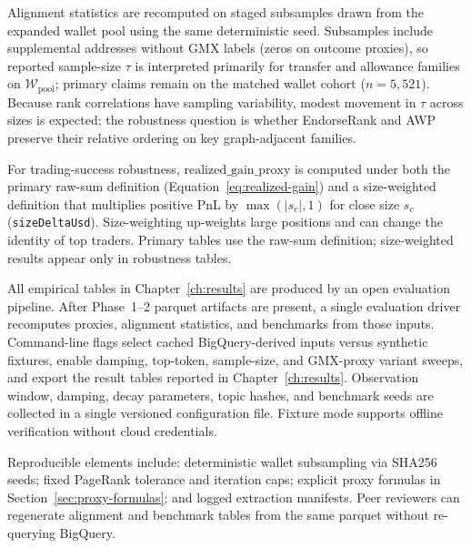 Alignment statistics are recomputed on staged subsamples drawn from the expanded wallet pool using the same deterministic seed. Subsamples include supplemental addresses without GMX labels (zeros on outcome proxies), so reported sample-size $\tau$ is interpreted primarily for transfer and allowance families on $\mathcal{W}_{\mathrm{pool}}$; primary claims remain on the matched wallet cohort ($n=5{,}521$). Because rank correlations have sampling variability, modest movement in $\tau$ across sizes is expected; the robustness question is whether EndorseRank and AWP preserve their relative ordering on key graph-adjacent families.


For trading-success robustness, $\mathrm{realized\_gain\_proxy}$ is computed under both the primary raw-sum definition (Equation~\eqref{eq:realized-gain}) and a size-weighted definition that multiplies positive PnL by $\max(|s_c|,1)$ for close size $s_c$ (\texttt{sizeDeltaUsd}). Size-weighting up-weights large positions and can change the identity of top traders. Primary tables use the raw-sum definition; size-weighted results appear only in robustness tables.


All empirical tables in Chapter~\ref{ch:results} are produced by an open evaluation pipeline. After Phase~1--2 parquet artifacts are present, a single evaluation driver recomputes proxies, alignment statistics, and benchmarks from those inputs. Command-line flags select cached BigQuery-derived inputs versus synthetic fixtures, enable damping, top-token, sample-size, and GMX-proxy variant sweeps, and export the result tables reported in Chapter~\ref{ch:results}. Observation window, damping, decay parameters, topic hashes, and benchmark seeds are collected in a single versioned configuration file. Fixture mode supports offline verification without cloud credentials.

Reproducible elements include: deterministic wallet subsampling via SHA256 seeds; fixed PageRank tolerance and iteration caps; explicit proxy formulas in Section~\ref{sec:proxy-formulas}; and logged extraction manifests. Peer reviewers can regenerate alignment and benchmark tables from the same parquet without re-querying BigQuery.


